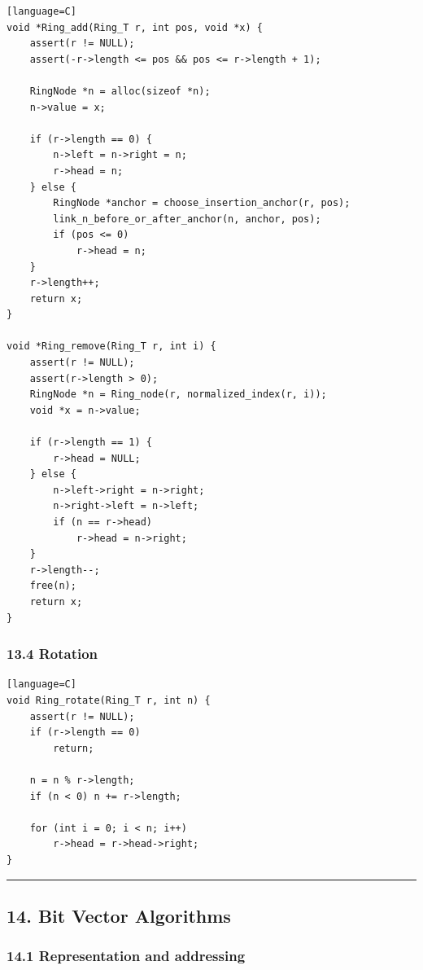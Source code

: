 \documentclass[11pt]{article}
\begin{document}
\begin{verbatim}[language=C]
void *Ring_add(Ring_T r, int pos, void *x) {
    assert(r != NULL);
    assert(-r->length <= pos && pos <= r->length + 1);

    RingNode *n = alloc(sizeof *n);
    n->value = x;

    if (r->length == 0) {
        n->left = n->right = n;
        r->head = n;
    } else {
        RingNode *anchor = choose_insertion_anchor(r, pos);
        link_n_before_or_after_anchor(n, anchor, pos);
        if (pos <= 0)
            r->head = n;
    }
    r->length++;
    return x;
}

void *Ring_remove(Ring_T r, int i) {
    assert(r != NULL);
    assert(r->length > 0);
    RingNode *n = Ring_node(r, normalized_index(r, i));
    void *x = n->value;

    if (r->length == 1) {
        r->head = NULL;
    } else {
        n->left->right = n->right;
        n->right->left = n->left;
        if (n == r->head)
            r->head = n->right;
    }
    r->length--;
    free(n);
    return x;
}
\end{verbatim}

\subsubsection{13.4 Rotation}\label{rotation}

\begin{verbatim}[language=C]
void Ring_rotate(Ring_T r, int n) {
    assert(r != NULL);
    if (r->length == 0)
        return;

    n = n % r->length;
    if (n < 0) n += r->length;

    for (int i = 0; i < n; i++)
        r->head = r->head->right;
}
\end{verbatim}

\begin{center}\rule{0.5\linewidth}{0.5pt}\end{center}

\subsection{14. Bit Vector Algorithms}\label{bit-vector-algorithms}

\subsubsection{14.1 Representation and addressing}\label{representation-and-addressing}
\end{document}

